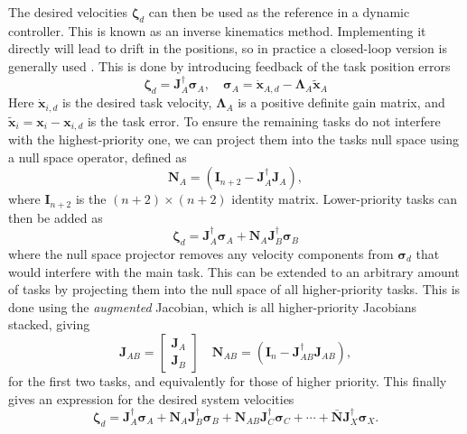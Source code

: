 \documentclass[../main.tex]{subfiles}
\begin{document}
The desired velocities $\bm{\zeta}_d$ can then be used as the reference in a dynamic controller. This is known as an inverse kinematics method. Implementing it directly will lead to drift in the positions, so in practice a closed-loop version is generally used \citep{chiaverini1997}. This is done by introducing feedback of the task position errors
\begin{equation}
    \label{eq:single_task}
    \bm{\zeta}_d = \bm{J}_A^{\dagger} \bm{\sigma}_{A},
    \quad
    \bm{\sigma}_A = \dot{\bm{x}}_{A, d} - \bm{\Lambda}_A \tilde{\bm{x}}_A
\end{equation}
Here $\dot{\bm{x}}_{i, d}$ is the desired task velocity, $\bm{\Lambda}_A$ is a positive definite gain matrix, and $\tilde{\bm{x}}_i = \bm{x}_{i} - \bm{x}_{i, d}$ is the task error. To ensure the remaining tasks do not interfere with the highest-priority one, we can project them into the tasks null space using a null space operator, defined as
\begin{equation}
    \bm{N}_A = (\bm{I}_{n+2} - \bm{J}_A^{\dagger} \bm{J}_A),
\end{equation}
where $\bm{I}_{n+2}$ is the $(n+2) \times (n+2)$ identity matrix. Lower-priority tasks can then be added as
\begin{equation}
    \bm{\zeta}_d = \bm{J}_A^{\dagger} \bm{\sigma}_A
    + \bm{N}_A \bm{J}_B^{\dagger} \bm{\sigma}_B
\end{equation}
where the null space projector removes any velocity components from $\bm{\sigma}_d$ that would interfere with the main task. This can be extended to an arbitrary amount of tasks by projecting them into the null space of all higher-priority tasks. This is done using the \emph{augmented} Jacobian, which is all higher-priority Jacobians stacked, giving
\begin{equation}
    \bm{J}_{AB} = \begin{bmatrix}
        \bm{J}_A \\ \bm{J}_B
    \end{bmatrix} \quad
    \bm{N}_{AB} = (\bm{I}_n - \bm{J}_{AB}^{\dagger} \bm{J}_{AB}),
\end{equation}
for the first two tasks, and equivalently for those of higher priority.
This finally gives an expression for the desired system velocities
\begin{equation}
    \bm{\zeta}_d = \bm{J}_A^{\dagger} \bm{\sigma}_A
    + \bm{N}_A \bm{J}_B^{\dagger} \bm{\sigma}_B
    + \bm{N}_{AB} \bm{J}_C^{\dagger} \bm{\sigma}_C
    + \cdots
    + \bar{\bm{N}} \bm{J}_X^{\dagger} \bm{\sigma}_X.
\end{equation}
\end{document}
